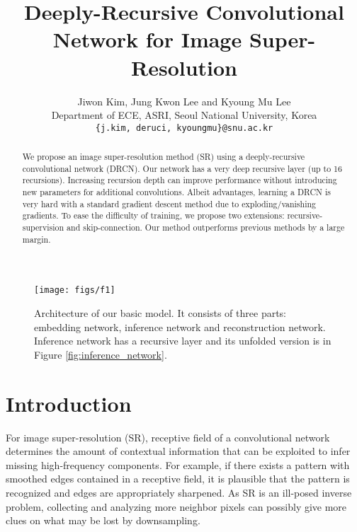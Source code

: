 \documentclass[10pt,twocolumn,letterpaper]{article}
\begin{document}
\title{Deeply-Recursive Convolutional Network for Image Super-Resolution}

\author{Jiwon Kim, Jung Kwon Lee and Kyoung Mu Lee\\
	Department of ECE, ASRI, Seoul National University, Korea\\
	{\tt\small \{j.kim, deruci, kyoungmu\}@snu.ac.kr}
}

\maketitle





\begin{abstract}
We propose an image super-resolution method (SR) using a deeply-recursive convolutional network (DRCN). Our network has a very deep recursive layer (up to 16 recursions). Increasing recursion depth can improve performance without introducing new parameters for additional convolutions. Albeit advantages, learning a DRCN is very hard with a standard gradient descent method due to exploding/vanishing gradients. To ease the difficulty of training, we propose two extensions: recursive-supervision and skip-connection. Our method outperforms previous methods by a large margin.
\end{abstract}

\begin{figure*}[t]
	\texttt{[image: figs/f1]}
	\caption {Architecture of our basic model. It consists of three parts: embedding network, inference network and reconstruction network. Inference network has a recursive layer and its unfolded version is in Figure \ref{fig:inference_network}.}
	\label{fig:overview}
\end{figure*}



\section{Introduction}
For image super-resolution (SR), receptive field of a convolutional network determines the amount of contextual information that can be exploited to infer missing high-frequency components. For example, if there exists a pattern with smoothed edges contained in a receptive field, it is plausible that the pattern is recognized and edges are appropriately sharpened. As SR is an ill-posed inverse problem, collecting and analyzing more neighbor pixels can possibly give more clues on what may be lost by downsampling. 
\end{document}
